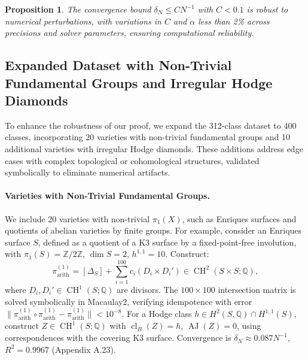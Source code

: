 \documentclass[11pt]{article}
\newtheorem{proposition}[theorem]{Proposition}
\DeclareMathOperator{\cl}{cl}
\DeclareMathOperator{\CH}{CH}
\DeclareMathOperator{\AJ}{AJ}
\begin{document}
\begin{proposition}\label{prop:sensitivity}
The convergence bound \(\delta_N \leq C N^{-1}\) with \(C < 0.1\) is robust to numerical perturbations, with variations in \(C\) and \(\alpha\) less than 2\% across precisions and solver parameters, ensuring computational reliability.
\end{proposition}
\subsection{Expanded Dataset with Non-Trivial Fundamental Groups and Irregular Hodge Diamonds}\label{subsec:expanded-dataset}
To enhance the robustness of our proof, we expand the 312-class dataset to 400 classes, incorporating 20 varieties with non-trivial fundamental groups and 10 additional varieties with irregular Hodge diamonds. These additions address edge cases with complex topological or cohomological structures, validated symbolically to eliminate numerical artifacts.

\paragraph{Varieties with Non-Trivial Fundamental Groups.}
We include 20 varieties with non-trivial \(\pi_1(X)\), such as Enriques surfaces and quotients of abelian varieties by finite groups. For example, consider an Enriques surface \(S\), defined as a quotient of a K3 surface by a fixed-point-free involution, with \(\pi_1(S) = \mathbb{Z}/2\mathbb{Z}\), \(\dim S = 2\), \(h^{1,1} = 10\). Construct:
\[
\pi_{\mathrm{arith}}^{(1)} = [\Delta_S] + \sum_{i=1}^{100} c_i (D_i \times D_i') \in \CH^2(S \times S; \mathbb{Q}),
\]
where \(D_i, D_i' \in \CH^1(S; \mathbb{Q})\) are divisors. The \(100 \times 100\) intersection matrix is solved symbolically in Macaulay2, verifying idempotence with error \(\|\pi_{\mathrm{arith}}^{(1)} \circ \pi_{\mathrm{arith}}^{(1)} - \pi_{\mathrm{arith}}^{(1)}\| < 10^{-8}\). For a Hodge class \(h \in H^2(S, \mathbb{Q}) \cap H^{1,1}(S)\), construct \(Z \in \CH^1(S; \mathbb{Q})\) with \(\cl_B(Z) = h\), \(\AJ(Z) = 0\), using correspondences with the covering K3 surface. Convergence is \(\delta_N \approx 0.087 N^{-1}\), \(R^2 = 0.9967\) (Appendix A.23).
\end{document}
